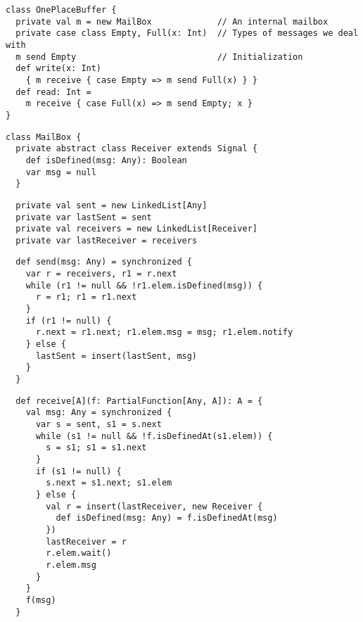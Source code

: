 \begin{lstlisting}
class OnePlaceBuffer {
  private val m = new MailBox             // An internal mailbox
  private case class Empty, Full(x: Int)  // Types of messages we deal with
  m send Empty                            // Initialization
  def write(x: Int)
    { m receive { case Empty => m send Full(x) } }
  def read: Int =
    m receive { case Full(x) => m send Empty; x }
}
\end{lstlisting}
\begin{lstlisting}
class MailBox {
  private abstract class Receiver extends Signal {
    def isDefined(msg: Any): Boolean
    var msg = null
  }
\end{lstlisting}
\begin{lstlisting}
  private val sent = new LinkedList[Any]
  private var lastSent = sent
  private val receivers = new LinkedList[Receiver]
  private var lastReceiver = receivers
\end{lstlisting}
\begin{lstlisting}
  def send(msg: Any) = synchronized {
    var r = receivers, r1 = r.next
    while (r1 != null && !r1.elem.isDefined(msg)) {
      r = r1; r1 = r1.next
    }
    if (r1 != null) {
      r.next = r1.next; r1.elem.msg = msg; r1.elem.notify
    } else {
      lastSent = insert(lastSent, msg)
    }
  }
\end{lstlisting}
\begin{lstlisting}
  def receive[A](f: PartialFunction[Any, A]): A = {
    val msg: Any = synchronized {
      var s = sent, s1 = s.next
      while (s1 != null && !f.isDefinedAt(s1.elem)) {
        s = s1; s1 = s1.next
      }
      if (s1 != null) {
        s.next = s1.next; s1.elem
      } else {
        val r = insert(lastReceiver, new Receiver {
          def isDefined(msg: Any) = f.isDefinedAt(msg)
        })
        lastReceiver = r
        r.elem.wait()
        r.elem.msg
      }
    }
    f(msg)
  }
\end{lstlisting}
